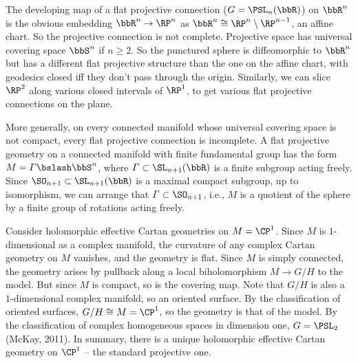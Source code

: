 \begin{example}\label{ex flat projective structures}
    The developing map of a flat projective connection ($G=\PSL_n(\bbR)$) on $\bbR^n$ is the obvious embedding $\bbR^n\to \RP^n$ as $\bbR^n\cong \RP^n\setminus \RP^{n-1}$, an affine chart. So the projective connection is not complete. Projective space has universal covering space $\bbS^n$ if $n\geq 2$. So the punctured sphere is diffeomorphic to $\bbR^n$ but has a different flat projective structure than the one on the affine chart, with geodesics closed iff they don't pass through the origin. Similarly, we can slice $\RP^2$ along various closed intervals of $\RP^1$, to get various flat projective connections on the plane.

    More generally, on every connected manifold whose universal covering space is not compact, every flat projective connection is incomplete. A flat projective geometry on a connected manifold with finite fundamental group has the form $M=\varGamma\bslash \bbS^n$, where $\varGamma\subset \SL_{n+1}(\bbR)$ is a finite subgroup acting freely. Since $\SO_{n+1}\subset\SL_{n+1}(\bbR)$ is a maximal compact subgroup, up to isomorphism, we can arrange that $\varGamma\subset\SO_{n+1}$, i.e., $M$ is a quotient of the sphere by a finite group of rotations acting freely.
\end{example}

\begin{example}
    Consider holomorphic effective Cartan geometries on $M=\CP^1$. Since $M$ is $1$-dimensional as a complex manifold, the curvature of any complex Cartan geometry on $M$ vanishes, and the geometry is flat. Since $M$ is simply connected, the geometry arises by pullback along a local biholomorphism $M\to G\slash H$ to the model. But since $M$ is compact, so is the covering map. Note that $G\slash H$ is also a $1$-dimensional complex manifold, so an oriented surface. By the classification of oriented surfaces, $G\slash H\cong M=\CP^1$, so the geometry is that of the model. By the classification of complex homogeneous spaces in dimension one, $G=\PSL_2$ (McKay, 2011). In summary, there is a unique holomorphic effective Cartan geometry on $\CP^1$ -- the standard projective one.
\end{example}

